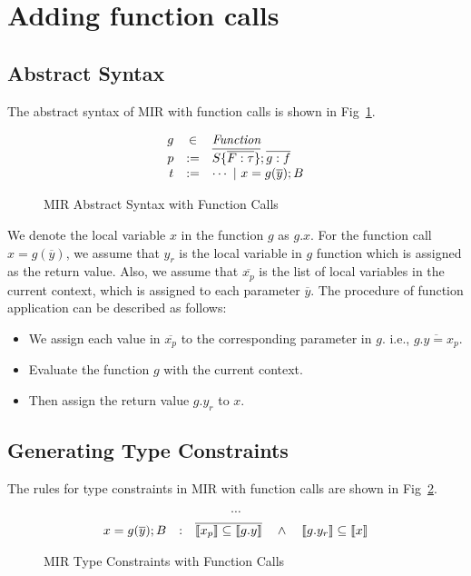 \documentclass[peerreview, 10pt]{IEEEtran}
\newcommand{\cons}[1]{\ensuremath{\llbracket#1\rrbracket}}
\newcommand{\ifrule}[2]{\ensuremath{#1&:&#2}}
\begin{document}
\section{Adding function calls}

\subsection{Abstract Syntax}
The abstract syntax of MIR with function calls is shown in Fig~\ref{fig:mir-funcalls-absyn}.
\begin{figure}[ht]
\centering
\begin{framed}
\[
  \begin{array}{@{}rcl@{}}
    g &\in& \mathit{Function} \\
    p &:=& \overline{S \{ \overline{F:\tau} \}}; \overline{g:f} \\
    t &:=& \cdots\ |\ x=g(\overline{y}); B \\
  \end{array}
\]
\end{framed}
\caption{MIR Abstract Syntax with Function Calls}
\label{fig:mir-funcalls-absyn}
\end{figure}

We denote the local variable $x$ in the function $g$ as ${g.x}$. For the function call $x=g(\overline{y})$, we assume that $y_r$ is the local variable in $g$ function which is assigned as the return value. Also, we assume that $\overline{x_p}$ is the list of local variables in the current context, which is assigned to each parameter $\overline{y}$. The procedure of function application can be described as follows:

\begin{itemize}
  \item We assign each value in $\overline{x_p}$ to the corresponding parameter in $g$. i.e., $\overline{g.y=x_p}$.
  \item Evaluate the function $g$ with the current context.
  \item Then assign the return value $g.y_r$ to $x$. 
\end{itemize}

\subsection{Generating Type Constraints}

The rules for type constraints in MIR with function calls are shown in Fig~\ref{fig:mir-funcalls-type-constraints}.
\begin{figure}[ht]
\begin{framed}
\[\cdots\]
\[\begin{array}{@{}ccl@{}}
  \ifrule{x=g(\overline{y}); B}{\overline{\cons{x_p}\subseteq\cons{g.y}}\quad\land\quad \cons{g.y_r}\subseteq\cons{x}}\\
\end{array}\]
\end{framed}
\caption{MIR Type Constraints with Function Calls}
\label{fig:mir-funcalls-type-constraints}
\end{figure}
\end{document}
